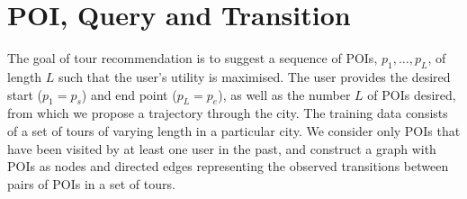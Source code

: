 
\section{POI, Query and Transition}
\label{sec:feature}
\secmoveup


The goal of tour recommendation is to suggest a sequence of POIs, $p_1, \ldots, p_L$, of length $L$ such that the user's utility is maximised. The user provides the desired start ($p_1=p_s$) and end point ($p_L=p_e$), as well as the number $L$ of POIs desired, from which we propose a trajectory through the city.
%
%
The training data consists of a set of tours of varying length in a particular city.
We consider only POIs that have been visited by at least one user in the past, and
construct a graph with POIs as nodes and directed edges representing the observed transitions between pairs of POIs in a set of tours.




